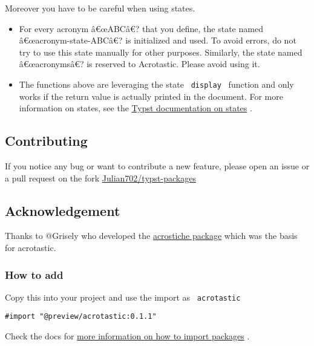 Moreover you have to be careful when using states.

\begin{itemize}
\tightlist
\item
  For every acronym â€œABCâ€? that you define, the state named
  â€œacronym-state-ABCâ€? is initialized and used. To avoid errors, do
  not try to use this state manually for other purposes. Similarly, the
  state named â€œacronymsâ€? is reserved to Acrotastic. Please avoid
  using it.
\item
  The functions above are leveraging the state \texttt{\ display\ }
  function and only works if the return value is actually printed in the
  document. For more information on states, see the
  \href{https://typst.app/docs/reference/introspection/state/}{Typst
  documentation on states} .
\end{itemize}

\subsection{Contributing}\label{contributing}

If you notice any bug or want to contribute a new feature, please open
an issue or a pull request on the fork
\href{https://github.com/Julian702/typst-packages?tab=readme-ov-file}{Julian702/typst-packages}

\subsection{Acknowledgement}\label{acknowledgement}

Thanks to @Grisely who developed the
\href{https://typst.app/universe/package/acrostiche/}{acrostiche
package} which was the basis for acrotastic.

\subsubsection{How to add}\label{how-to-add}

Copy this into your project and use the import as
\texttt{\ acrotastic\ }

\begin{verbatim}
#import "@preview/acrotastic:0.1.1"
\end{verbatim}



Check the docs for
\href{https://typst.app/docs/reference/scripting/\#packages}{more
information on how to import packages} .

